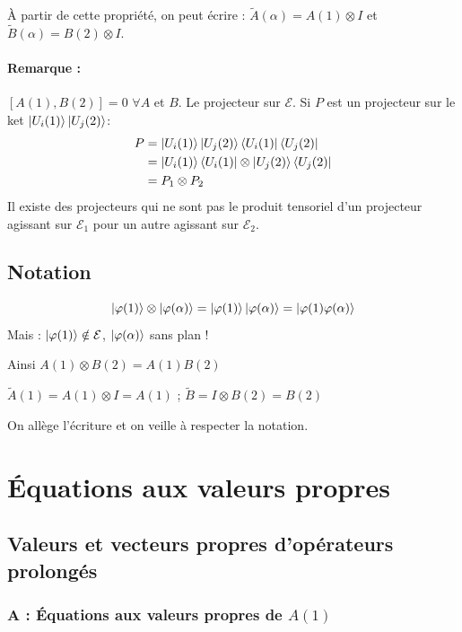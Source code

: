 \documentclass[12pt,a4paper,titlepage]{book}
\begin{document}
À partir de cette propriété, on peut écrire : $\tilde{A} (\alpha) = A(1) \otimes I$ et $\tilde{B} (\alpha) = B(2) \otimes I$.

\paragraph*{Remarque :}

$[A(1), B(2)] = 0$  $\forall A$ et $B$. Le projecteur sur $\mathcal{E}$. Si $P$ est un projecteur sur le ket $\ket{U_i (1)} \ket{U_j (2)}$:
\begin{align*}
P &= \ket{U_i (1)} \ket{U_j (2)} \bra{U_i (1)} \bra{U_j (2)}\\
&= \ket{U_i (1)} \bra{U_i (1)} \otimes \ket{U_j (2)} \bra{U_j (2)}\\
&= P_1 \otimes P_2
\end{align*}
Il existe des projecteurs qui ne sont pas le produit tensoriel d'un projecteur agissant sur $\mathcal{E}_1$ pour un autre agissant sur $\mathcal{E}_2$.

\subsection{Notation}

\begin{equation*}
\ket{\varphi (1)} \otimes \ket{\varphi (\alpha)} = \ket{\varphi (1)} \ket{\varphi (\alpha)} = \ket{\varphi (1) \varphi (\alpha)}
\end{equation*}
Mais : $\ket{\varphi (1)} \notin \mathcal{E}$, $\ket{\varphi (\alpha)}$ sans plan !

Ainsi $A(1) \otimes B(2) = A(1)B(2)$

$\tilde{A} (1) = A(1) \otimes I = A (1)$ ; $\tilde{B} = I \otimes B(2) = B (2)$

On allège l'écriture et on veille à respecter la notation.

\section{Équations aux valeurs propres}

\subsection{Valeurs et vecteurs propres d'opérateurs prolongés}

\subsubsection{A : Équations aux valeurs propres de $A(1)$}
\end{document}
